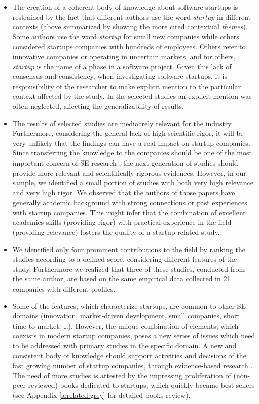 \documentclass[final,5p,times,twocolumn]{elsarticle}
\begin{document}
\begin{itemize}
\item The creation of a coherent body of knowledge about software startups is restrained by the fact that different authors use the word \textit{startup} in different contexts (above summarized by showing the more cited contextual \textit{themes}). Some authors use the word \textit{startup} for small new companies while others considered startups companies with hundreds of employees. Others refer to innovative companies or operating in uncertain markets, and for others, \textit{startup} is the name of a phase in a software project. Given this lack of consensus and consistency, when investigating software startups, it is responsibility of the researcher to make explicit mention to the particular context affected by the study. In the selected studies an explicit mention was often neglected, affecting the generalizability of results.
\item The results of selected studies are mediocrely relevant for the industry. Furthermore, considering the general lack of high scientific rigor, it will be very unlikely that the findings can have a real impact on startup companies. Since transferring the knowledge to the companies should be one of the most important concern of SE research \cite{Ivarsson2010}, the next generation of studies should provide more relevant and scientifically rigorous evidences. However, in our sample, we identified a small portion of studies with both very high relevance and very high rigor. We observed that the authors of those papers have generally academic background with strong connections or past experiences with startup companies. This might infer that the combination of excellent academics skills (providing rigor) with practical experience in the field (providing relevance) fosters the quality of a startup-related study.
\item We identified only four prominent contributions to the field by ranking the studies according to a defined score, considering different features of the study. Furthermore we realized that three of these studies, conducted from the same author, are based on the same empirical data collected in 21 companies with different profiles.
\item Some of the features, which characterize startups, are common to other SE domains (innovation, market-driven development, small companies, short time-to-market, \ldots). However, the unique combination of elements, which coexists in modern startup companies, poses a new series of issues which need to be addressed with primary studies in the specific domain. A new and consistent body of knowledge should support activities and decisions of the fast growing number of startup companies, through evidence-based research \cite{Kitchenham2005,Wohlin2000}. The need of more studies is attested by the impressing proliferation of (non-peer reviewed) books dedicated to startups, which quickly became best-sellers (see Appendix \ref{a:related:grey} for detailed books review).

\end{itemize}
\end{document}
